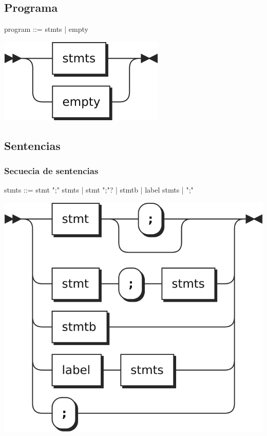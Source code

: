 \subsection{Programa}
\begin{multicols}{2}
\begin{myverbatim}
program  ::=  stmts
            | empty
\end{myverbatim}  
\columnbreak
\begin{center}
\includegraphics[scale=0.7]{diagram/program.png} \\
\end{center}
\end{multicols}
\subsection{Sentencias}
\subsubsection{Secuecia de sentencias}
\begin{multicols}{2}
\begin{myverbatim}
stmts    ::=   stmt ";" stmts
            |  stmt ";"?
            |  stmtb 
            |  label stmts
            |  ";"
\end{myverbatim}  	
\columnbreak
\begin{center}
\includegraphics[scale=0.7]{diagram/stmts.png} \\
\end{center}
\end{multicols}
\pagebreak
